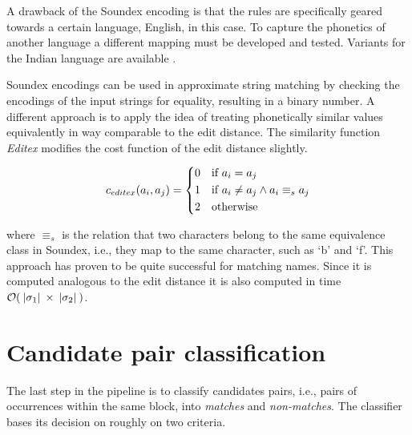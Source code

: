 A drawback of the Soundex encoding is that the rules are specifically geared towards a certain language, English, in this case.
To capture the phonetics of another language a different mapping must be developed and tested.
Variants for the Indian language are available \citep{Shah2014}.

Soundex encodings can be used in approximate string matching by checking the encodings of the input strings for equality, resulting in a binary number.
A different approach is to apply the idea of treating phonetically similar values equivalently in way comparable to the edit distance.
The similarity function \emph{Editex} modifies the cost function of the edit distance slightly.

\begin{equation}
    c_{editex}(a_i, a_j) =
    \begin{dcases}
        0 & \text{if } a_i = a_j \\
        1 & \text{if } a_i \neq a_j \wedge a_i \equiv_s a_j \\
        2 & \text{otherwise}
    \end{dcases}
\end{equation}

\noindent where $\equiv_s$ is the relation that two characters belong to the same equivalence class in Soundex, i.e., they map to the same character, such as `b' and `f'.
This approach has proven to be quite successful for matching names\citep{Zobel1996}.
Since it is computed analogous to the edit distance it is also computed in time $\mathcal{O}(\:\vert {\sigma_1} \vert\: \times \:\vert {\sigma_2} \vert\:)$.




\section{Candidate pair classification}
\label{sec:classification}

The last step in the pipeline is to classify candidates pairs, i.e., pairs of occurrences within the same block, into \emph{matches} and \emph{non-matches}.
The classifier bases its decision on roughly on two criteria.

